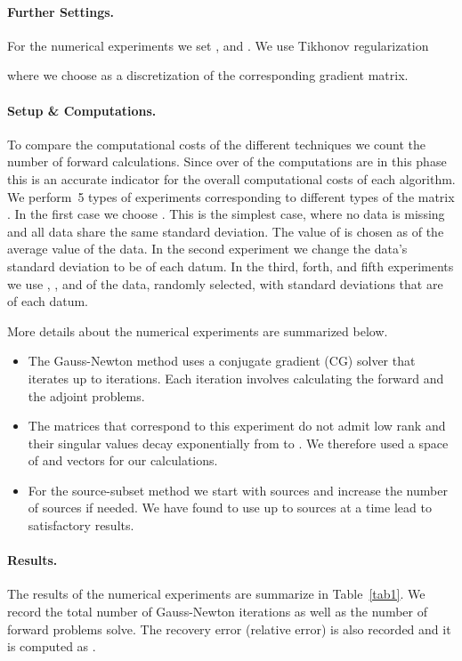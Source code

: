 \documentclass[12pt]{article}
\begin{document}
\paragraph{Further Settings.} For the numerical experiments we set ,  and .
We use Tikhonov regularization

where we choose  as a discretization of the corresponding gradient matrix.

\paragraph{Setup \& Computations.} To compare the computational costs of the different techniques we count the number of forward calculations. Since over  of the computations are in this phase this is an accurate indicator for the overall computational costs of each algorithm. We perform~5 types of experiments corresponding to  different types of the matrix . In the first case we choose . This is the simplest case, where no data is missing and all data share the same standard deviation. The value of  is chosen as  of the average value of the data. In the second experiment we change the data's standard deviation to be  of each datum.
In the third, forth, and fifth experiments we use , , and  of the data, randomly selected, with standard deviations
that are  of each datum.

More details about the numerical experiments are summarized below.
\begin{itemize}
\item The Gauss-Newton method uses a conjugate gradient (CG) solver that iterates up to  iterations. Each iteration involves calculating the forward and the adjoint problems.
\item The matrices  that correspond to this experiment do not admit low rank and their singular values decay exponentially from  to . We therefore used a space of  and  vectors for our calculations.
\item For the source-subset method we start with  sources and increase the number of sources if needed. We have found to use up to  sources at a time lead to satisfactory results.
\end{itemize}
\paragraph{Results.} The results of the numerical experiments are summarize in Table~\ref{tab1}. We record the total number of Gauss-Newton iterations as well as the number of forward problems solve. The recovery error (relative error) is also recorded and it is computed
as .
\end{document}
